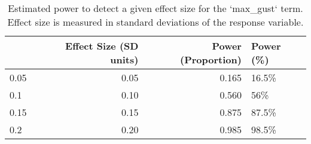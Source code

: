 \begin{table}

\caption{Estimated power to detect a given effect size for the `max_gust` term. Effect size is measured in standard deviations of the response variable.}
\centering
\begin{tabular}[t]{lrrl}
\toprule
  & Effect Size (SD units) & Power (Proportion) & Power (\%)\\
\midrule
0.05 & 0.05 & 0.165 & 16.5\%\\
0.1 & 0.10 & 0.560 & 56\%\\
0.15 & 0.15 & 0.875 & 87.5\%\\
0.2 & 0.20 & 0.985 & 98.5\%\\
\bottomrule
\end{tabular}
\end{table}
